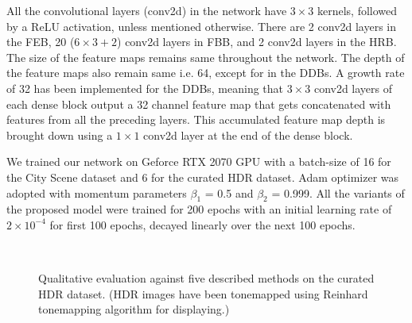 \documentclass[conference]{IEEEtran}
\begin{document}
All the convolutional layers (conv2d) in the network have $3 \times 3$ kernels, followed by a ReLU activation, unless mentioned otherwise. There are 2 conv2d layers in the FEB, 20 ($6\times 3 +2$) conv2d layers in FBB, and 2 conv2d layers in the HRB. The size of the feature maps remains same throughout the network. The depth of the feature maps also remain same i.e. 64, except for in the DDBs.
A growth rate of 32 has been implemented for the DDBs, meaning that $3 \times 3$ conv2d layers of each dense block output a 32 channel feature map that gets concatenated with features from all the preceding layers. This accumulated feature map depth is brought down using a $1 \times 1$ conv2d layer at the end of the dense block.

We trained our network on Geforce RTX 2070 GPU with a batch-size of 16 for the City Scene dataset and 6 for the curated HDR dataset. Adam optimizer \cite{kingma2014adam} was adopted with momentum parameters $\beta_{1}$ = 0.5 and $\beta_{2}$ = 0.999. All the variants of the proposed model were trained for 200 epochs with an initial learning rate of $ 2 \times 10^{-4}$ for first 100 epochs, decayed linearly over the next 100 epochs. 





\begin{figure*}\centering
    \\[-4.2ex]\qquad
    \caption{Qualitative evaluation against five described methods on the curated HDR dataset. (HDR images have been tonemapped using Reinhard tonemapping algorithm \cite{Reinhard:2002:PTR:566654.566575} for displaying.)}
    \label{fig5}\end{figure*}
\end{document}
